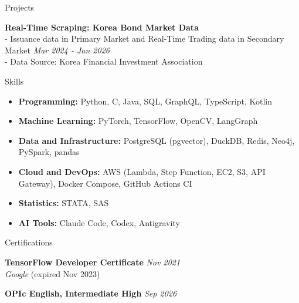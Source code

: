 \documentclass{resume} %
\begin{document}
\begin{rSection}{Projects}

{\bf Real-Time Scraping: Korea Bond Market Data }
\\- Issuance data in Primary Market and Real-Time Trading data in Secondary Market \hfill {\em Mar 2024 - Jan 2026}
\\- Data Source: Korea Financial Investment Association

\end{rSection}


\begin{rSection}{Skills}
\begin{itemize}
    \item {\bf Programming:} Python, C, Java, SQL, GraphQL, TypeScript, Kotlin
    \item {\bf Machine Learning:} PyTorch, TensorFlow, OpenCV, LangGraph
    \item {\bf Data and Infrastructure:} PostgreSQL (pgvector), DuckDB, Redis, Neo4j, PySpark, pandas
    \item {\bf Cloud and DevOps:} AWS (Lambda, Step Function, EC2, S3, API Gateway), Docker Compose, GitHub Actions CI
    \item {\bf Statistics:} STATA, SAS
    \item {\bf AI Tools:} Claude Code, Codex, Antigravity
\end{itemize}
\end{rSection}


\begin{rSection}{Certifications}

{\bf TensorFlow Developer Certificate} \hfill {\em Nov 2021}
\\ \textit{Google} (expired Nov 2023)

{\bf OPIc English, Intermediate High} \hfill {\em Sep 2026}

\end{rSection}
\end{document}
